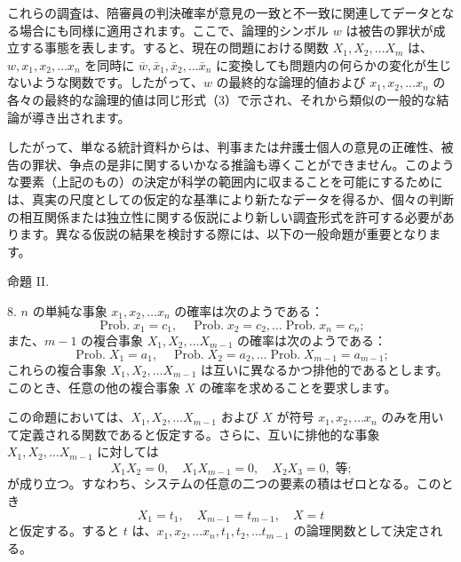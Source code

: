 \documentclass[a4paper,11pt,openany]{ltjsbook}
\begin{document}
これらの調査は、陪審員の判決確率が意見の一致と不一致に関連してデータとなる場合にも同様に適用されます。ここで、論理的シンボル \( w \) は被告の罪状が成立する事態を表します。すると、現在の問題における関数 \( X_1, X_2, \dots X_m \) は、\( w, x_1, x_2, \dots x_n \) を同時に \( \bar{w}, \bar{x}_1, \bar{x}_2, \dots \bar{x}_n \) に変換しても問題内の何らかの変化が生じないような関数です。したがって、\( w \) の最終的な論理的値および \( x_1, x_2, \dots x_n \) の各々の最終的な論理的値は同じ形式（3）で示され、それから類似の一般的な結論が導き出されます。

したがって、単なる統計資料からは、判事または弁護士個人の意見の正確性、被告の罪状、争点の是非に関するいかなる推論も導くことができません。このような要素（上記のもの）の決定が科学の範囲内に収まることを可能にするためには、真実の尺度としての仮定的な基準により新たなデータを得るか、個々の判断の相互関係または独立性に関する仮説により新しい調査形式を許可する必要があります。異なる仮説の結果を検討する際には、以下の一般命題が重要となります。

\begin{center}
\textsc{命題} II.
\end{center}

8. \( n \) の単純な事象 \( x_1, x_2, \dots x_n \) の確率は次のようである：
\[
\operatorname{Prob. } x_1 = c_1, \quad \operatorname{Prob. } x_2 = c_2, \dotsc \operatorname{Prob. } x_n = c_n;
\]
また、\( m-1 \) の複合事象 \( X_1, X_2, \dots X_{m-1} \) の確率は次のようである：
\[
\operatorname{Prob. } X_1 = a_1, \quad \operatorname{Prob. } X_2 = a_2, \dotsc \operatorname{Prob. } X_{m-1} = a_{m-1};
\]
これらの複合事象 \( X_1, X_2, \dots X_{m-1} \) は互いに異なるかつ排他的であるとします。このとき、任意の他の複合事象 \( X \) の確率を求めることを要求します。

この命題においては、$X_1, X_2, \dotsc X_{m-1}$ および $X$ が符号 $x_1, x_2, \dotsc x_n$ のみを用いて定義される関数であると仮定する。さらに、互いに排他的な事象 $X_1, X_2, \dotsc X_{m-1}$ に対しては
\begin{equation}\tag{3}
X_1 X_2 = 0, \quad X_1 X_{m-1} = 0, \quad X_2 X_3 = 0, \text{ 等;}
\end{equation}
が成り立つ。すなわち、システムの任意の二つの要素の積はゼロとなる。このとき
\begin{equation}\tag{4}
X_1 = t_1, \quad X_{m-1} = t_{m-1}, \quad X = t
\end{equation}
と仮定する。すると $t$ は、$x_1, x_2, \dotsc x_n, t_1, t_2, \dotsc t_{m-1}$ の論理関数として決定される。
\end{document}
